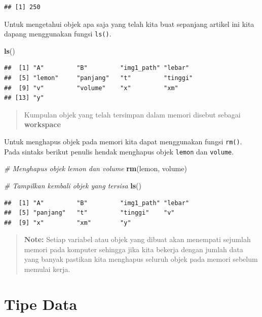 \documentclass[]{book}
\newenvironment{Shaded}{\begin{snugshade}}{\end{snugshade}}
\newcommand{\KeywordTok}[1]{\textcolor[rgb]{0.13,0.29,0.53}{\textbf{#1}}}
\newcommand{\CommentTok}[1]{\textcolor[rgb]{0.56,0.35,0.01}{\textit{#1}}}
\newcommand{\NormalTok}[1]{#1}
\begin{document}
\begin{verbatim}
## [1] 250
\end{verbatim}

Untuk mengetahui objek apa saja yang telah kita buat sepanjang artikel
ini kita dapang menggunakan fungsi \texttt{ls()}.

\begin{Shaded}
\begin{Highlighting}[]
\KeywordTok{ls}\NormalTok{()}
\end{Highlighting}
\end{Shaded}

\begin{verbatim}
##  [1] "A"         "B"         "img1_path" "lebar"    
##  [5] "lemon"     "panjang"   "t"         "tinggi"   
##  [9] "v"         "volume"    "x"         "xm"       
## [13] "y"
\end{verbatim}

\begin{quote}
Kumpulan objek yang telah tersimpan dalam memori disebut sebagai
\textbf{workspace}
\end{quote}

Untuk menghapus objek pada memori kita dapat menggunakan fungsi
\texttt{rm()}. Pada sintaks berikut penulis hendak menghapus objek
\texttt{lemon} dan \texttt{volume}.

\begin{Shaded}
\begin{Highlighting}[]
\CommentTok{# Menghapus objek lemon dan volume}
\KeywordTok{rm}\NormalTok{(lemon, volume)}

\CommentTok{# Tampilkan kembali objek yang tersisa}
\KeywordTok{ls}\NormalTok{()}
\end{Highlighting}
\end{Shaded}

\begin{verbatim}
##  [1] "A"         "B"         "img1_path" "lebar"    
##  [5] "panjang"   "t"         "tinggi"    "v"        
##  [9] "x"         "xm"        "y"
\end{verbatim}

\begin{quote}
\textbf{Note: } Setiap variabel atau objek yang dibuat akan menempati
sejumlah memori pada komputer sehingga jika kita bekerja dengan jumlah
data yang banyak pastikan kita menghapus seluruh objek pada memori
sebelum memulai kerja.
\end{quote}

\section{Tipe Data}\label{tipe-data}
\end{document}
